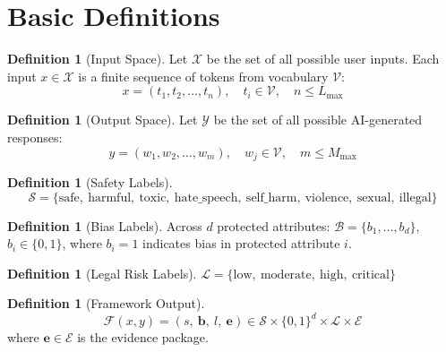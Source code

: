 \documentclass[12pt,a4paper]{report}
\theoremstyle{plain}
\theoremstyle{definition}
\newtheorem{definition}[theorem]{Definition}
\theoremstyle{remark}
\newcommand{\framework}{\mathcal{F}}
\newcommand{\inputspace}{\mathcal{X}}
\newcommand{\outputspace}{\mathcal{Y}}
\newcommand{\safetylabels}{\mathcal{S}}
\newcommand{\legalrisk}{\mathcal{L}}
\newcommand{\evidence}{\mathcal{E}}
\begin{document}
\section{Basic Definitions}

\begin{definition}[Input Space]
\label{def:input}
Let $\inputspace$ be the set of all possible user inputs.
Each input $x \in \inputspace$ is a finite sequence of
tokens from vocabulary $\mathcal{V}$:
\begin{equation}
    x = (t_1, t_2, \ldots, t_n),
    \quad t_i \in \mathcal{V},
    \quad n \leq L_{\max}
\end{equation}
\end{definition}

\begin{definition}[Output Space]
\label{def:output}
Let $\outputspace$ be the set of all possible AI-generated
responses:
\begin{equation}
    y = (w_1, w_2, \ldots, w_m),
    \quad w_j \in \mathcal{V},
    \quad m \leq M_{\max}
\end{equation}
\end{definition}

\begin{definition}[Safety Labels]
\label{def:safety-labels}
\begin{equation}
    \safetylabels = \{\text{safe},\ \text{harmful},\
    \text{toxic},\ \text{hate\_speech},\ \text{self\_harm},\
    \text{violence},\ \text{sexual},\ \text{illegal}\}
\end{equation}
\end{definition}

\begin{definition}[Bias Labels]
\label{def:bias-labels}
Across $d$ protected attributes:
$\mathcal{B} = \{b_1, \ldots, b_d\}$, $b_i \in \{0, 1\}$,
where $b_i = 1$ indicates bias in protected attribute $i$.
\end{definition}

\begin{definition}[Legal Risk Labels]
\label{def:legal-labels}
$\legalrisk = \{\text{low},\ \text{moderate},\
\text{high},\ \text{critical}\}$
\end{definition}

\begin{definition}[Framework Output]
\label{def:output-tuple}
\begin{equation}
    \framework(x, y)
    = (s,\ \mathbf{b},\ l,\ \mathbf{e})
    \in \safetylabels \times \{0,1\}^d
      \times \legalrisk \times \evidence
\end{equation}
where $\mathbf{e} \in \evidence$ is the evidence package.
\end{definition}
\end{document}
